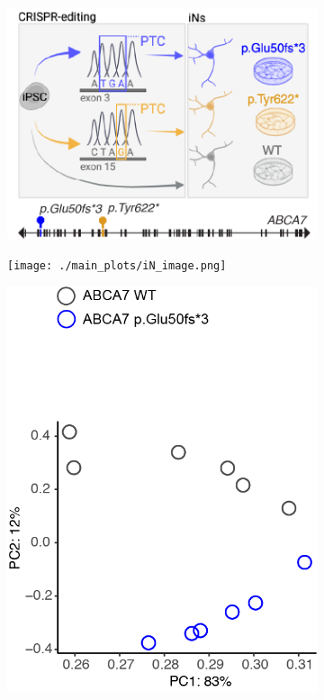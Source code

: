 \begin{figure}[ht]
    \begin{subfigure}[t]{.15\textwidth}
        \caption{}
        \includegraphics[width=\textwidth]{./main_plots/iN_cartoon.png}        
    \end{subfigure}    %
    \begin{subfigure}[t]{.15\textwidth}
        \caption{}
        \texttt{[image: ./main\_plots/iN\_image.png]}        
    \end{subfigure}  
    \begin{subfigure}[t]{.15\textwidth}
        \caption{}
        \includegraphics[width=\textwidth]{./main_plots/g2_pca_lipids.png}        

\end{subfigure}
\end{figure}
